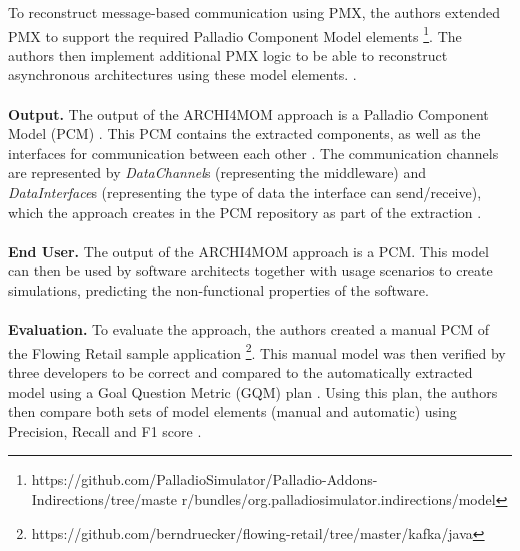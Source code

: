 To reconstruct message-based communication using PMX, the authors extended PMX to support the required Palladio Component Model elements \footnote{https://github.com/PalladioSimulator/Palladio-Addons-Indirections/tree/maste r/bundles/org.palladiosimulator.indirections/model}.
The authors then implement additional PMX logic to be able to reconstruct asynchronous architectures using these model elements.
\cite{Singh2022ARCHI4MOM}.
\\ \\
\textbf{Output.}
The output of the ARCHI4MOM approach is a Palladio Component Model (PCM) \cite{Singh2022ARCHI4MOM}.
This PCM contains the extracted components, as well as the interfaces for communication between each other \cite{Singh2022ARCHI4MOM}.
The communication channels are represented by \textit{DataChannel}s (representing the middleware) and \textit{DataInterface}s (representing the type of data the interface can send/receive), which the approach creates in the PCM repository as part of the extraction \cite{Singh2022ARCHI4MOM}.
\\ \\
\textbf{End User.}
The output of the ARCHI4MOM approach is a PCM.
This model can then be used by software architects together with usage scenarios to create simulations, predicting the non-functional properties of the software.
\\ \\
\textbf{Evaluation.}
To evaluate the approach, the authors created a manual PCM of the Flowing Retail sample application \footnote{https://github.com/berndruecker/flowing-retail/tree/master/kafka/java}.
This manual model was then verified by three developers to be correct and compared to the automatically extracted model using a Goal Question Metric (GQM) plan \cite{VanSolingen2002GQM,Singh2022ARCHI4MOM}.
Using this plan, the authors then compare both sets of model elements (manual and automatic) using Precision, Recall and F1 score \cite{Singh2022ARCHI4MOM}.


